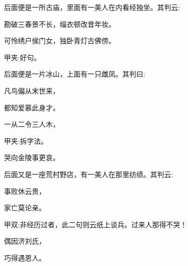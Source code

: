 \begin{parag}
    后面便是一所古庙，里面有一美人在内看经独坐。其判云:
\end{parag}


\begin{poem}
    \begin{pl}勘破三春景不长，缁衣顿改昔年妆。\end{pl}

    \begin{pl}可怜绣户侯门女，独卧青灯古佛傍。\end{pl}
    \begin{note}甲夹:好句。\end{note}
\end{poem}


\begin{parag}
    后面便是一片冰山，上面有一只雌凤。其判曰:
\end{parag}


\begin{poem}
    \begin{pl}凡鸟偏从末世来，\end{pl}

    \begin{pl}都知爱慕此身才。\end{pl}

    \begin{pl}一从二令三人木，\end{pl}\begin{note}甲夹:拆字法。\end{note}

    \begin{pl}哭向金陵事更哀。\end{pl}
\end{poem}


\begin{parag}
    后面又是一座荒村野店，有一美人在那里纺绩。其判云:
\end{parag}


\begin{poem}
    \begin{pl}事败休云贵，\end{pl}

    \begin{pl}家亡莫论亲。\end{pl}\begin{note}甲双:非经历过者，此二句则云纸上谈兵。过来人那得不哭！\end{note}

    \begin{pl}偶因济刘氏，\end{pl}

    \begin{pl}巧得遇恩人。\end{pl}

\end{poem}


